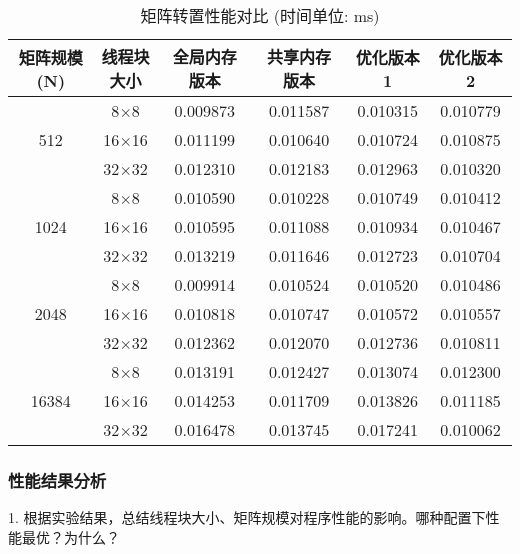 \documentclass{SYSUReport}
\begin{document}
\begin{table}[h!]
\centering
\caption{矩阵转置性能对比 (时间单位: ms)}
\begin{tabular}{|c|c|c|c|c|c|}
\hline
矩阵规模 (N) & 线程块大小 & 全局内存版本 & 共享内存版本 & 优化版本1 & 优化版本2 \\
\hline
\multirow{3}{*}{512} & 8$\times$8 &0.009873 &0.011587 &0.010315 &0.010779 \\
\cline{2-6} %
& 16$\times$16 &0.011199 &0.010640 &0.010724 &0.010875 \\
\cline{2-6}
& 32$\times$32 &0.012310 &0.012183 &0.012963 &0.010320 \\
\hline
\multirow{3}{*}{1024} & 8$\times$8 &0.010590 &0.010228 &0.010749 & 0.010412\\
\cline{2-6}
& 16$\times$16 &0.010595 &0.011088 &0.010934 &0.010467 \\
\cline{2-6}
& 32$\times$32 &0.013219 &0.011646&0.012723 &0.010704 \\
\hline
\multirow{3}{*}{2048} & 8$\times$8 &0.009914 &0.010524 &0.010520 &0.010486 \\
\cline{2-6}
& 16$\times$16 &0.010818 &0.010747 &0.010572 &0.010557 \\
\cline{2-6}
& 32$\times$32 &0.012362 &0.012070 &0.012736 &0.010811 \\
\hline
\multirow{3}{*}{16384} & 8$\times$8 &0.013191&0.012427 &0.013074 &0.012300 \\
\cline{2-6}
& 16$\times$16 &0.014253 &0.011709 &0.013826 &0.011185 \\
\cline{2-6}
& 32$\times$32 &0.016478 &0.013745 &0.017241 &0.010062 \\
\hline
\end{tabular}
\end{table}




\subsubsection{性能结果分析}
1. 根据实验结果，总结线程块大小、矩阵规模对程序性能的影响。哪种配置下性能最优？为什么？
\end{document}
